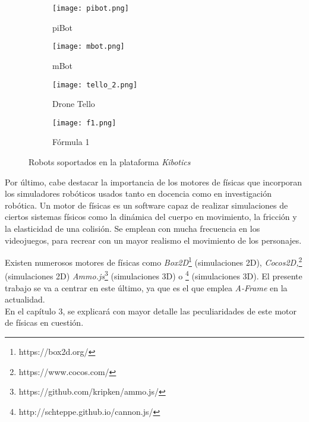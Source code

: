 \begin{figure}[h!]
  \begin{subfigure}[b]{0.2\textwidth}
    \texttt{[image: pibot.png]}
    \caption{piBot}
  \end{subfigure}
  \hfill
  \begin{subfigure}[b]{0.2\textwidth}
    \texttt{[image: mbot.png]}
    \caption{mBot}
  \end{subfigure}
    \hfill
  \begin{subfigure}[b]{0.2\textwidth}
    \texttt{[image: tello\_2.png]}
    \caption{Drone Tello}
  \end{subfigure}
    \hfill
  \begin{subfigure}[b]{0.2\textwidth}
    \texttt{[image: f1.png]}
    \caption{Fórmula 1}
  \end{subfigure}
\caption{Robots soportados en la plataforma \textit{Kibotics}}
\label{fig:RobotsKibotics}
\end{figure}


Por último, cabe destacar la importancia de los motores de físicas que incorporan los simuladores robóticos usados tanto en docencia como en investigación robótica. Un motor de físicas es un software capaz de realizar simulaciones de ciertos sistemas físicos como la dinámica del cuerpo en movimiento, la fricción y la elasticidad de una colisión. Se emplean con mucha frecuencia en los videojuegos, para recrear con un mayor realismo el movimiento de los personajes. \newline

Existen numerosos motores de físicas como \textit{Box2D}\footnote{https://box2d.org/} (simulaciones 2D), \textit{Cocos2D,}\footnote{https://www.cocos.com/} (simulaciones 2D) \textit{Ammo.js}\footnote{https://github.com/kripken/ammo.js/} (simulaciones 3D) o \footnote{http://schteppe.github.io/cannon.js/} (simulaciones 3D). El presente trabajo se va a centrar en este último, ya que es el que emplea \textit{A-Frame} en la actualidad. \\ En el capítulo 3, se explicará con mayor detalle las peculiaridades de este motor de físicas en cuestión. 

